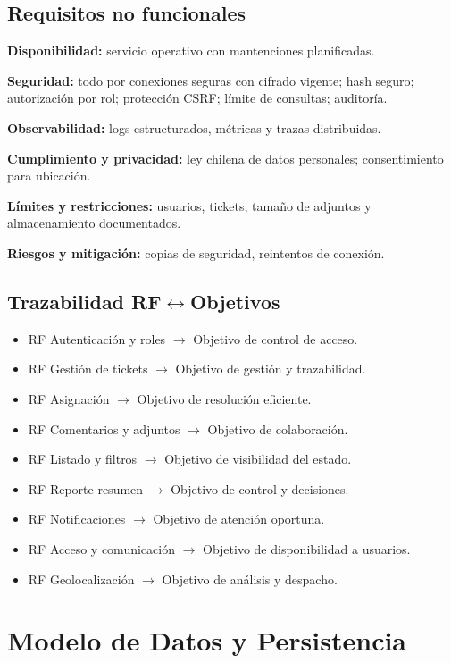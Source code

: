 \documentclass[12pt,a4paper]{article}
\begin{document}
\subsection{Requisitos no funcionales}

\textbf{Disponibilidad:} servicio operativo con mantenciones planificadas.

\textbf{Seguridad:} todo por conexiones seguras con cifrado vigente; hash seguro; autorización por rol; protección CSRF; límite de consultas; auditoría.

\textbf{Observabilidad:} logs estructurados, métricas y trazas distribuidas.

\textbf{Cumplimiento y privacidad:} ley chilena de datos personales; consentimiento para ubicación.

\textbf{Límites y restricciones:} usuarios, tickets, tamaño de adjuntos y almacenamiento documentados.

\textbf{Riesgos y mitigación:} copias de seguridad, reintentos de conexión.

\subsection{Trazabilidad RF\texorpdfstring{$\leftrightarrow$}{↔}Objetivos}

\begin{itemize}
    \item RF Autenticación y roles $\rightarrow$ Objetivo de control de acceso.
    \item RF Gestión de tickets $\rightarrow$ Objetivo de gestión y trazabilidad.
    \item RF Asignación $\rightarrow$ Objetivo de resolución eficiente.
    \item RF Comentarios y adjuntos $\rightarrow$ Objetivo de colaboración.
    \item RF Listado y filtros $\rightarrow$ Objetivo de visibilidad del estado.
    \item RF Reporte resumen $\rightarrow$ Objetivo de control y decisiones.
    \item RF Notificaciones $\rightarrow$ Objetivo de atención oportuna.
    \item RF Acceso y comunicación $\rightarrow$ Objetivo de disponibilidad a usuarios.
    \item RF Geolocalización $\rightarrow$ Objetivo de análisis y despacho.
\end{itemize}

\section{Modelo de Datos y Persistencia}
\end{document}
